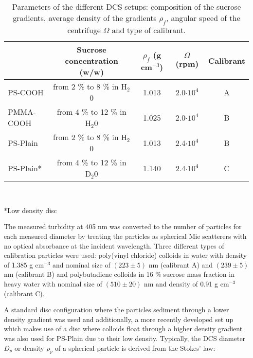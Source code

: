 \begin{table*}[]
\centering
\caption[Parameters of the different DCS setups.]{Parameters of the different DCS setups: composition of the sucrose gradients, average density of the gradients $\rho_f$, angular speed of the centrifuge $\Omega$ and type of calibrant.}
\label{tab:DCSParameters}
\begin{tabular}{l|c|c|c|c|}
\cline{2-5}
\multicolumn{1}{c|}{}                         & Sucrose concentration (w/w)    & $\rho_f$ (g cm$^{-3}$) & $\Omega$ (rpm)  & Calibrant \\ \hline
\multicolumn{1}{|l|}{PS-COOH}    & from 2 \% to 8 \% in H$_2$0  & 1.013                  & 2.0$\cdot 10^4$                  & A         \\ \hline
\multicolumn{1}{|l|}{PMMA-COOH}  & from 4 \% to 12 \% in H$_2$0 & 1.025                  & 2.0$\cdot 10^4$                  & B         \\ \hline
\multicolumn{1}{|l|}{PS-Plain}      & from 2 \% to 8 \% in H$_2$0  & 1.013     & 2.4$\cdot 10^4$                  & B        \\ \hline
\multicolumn{1}{|l|}{PS-Plain*} & from 4 \% to 12 \% in D$_2$0 & 1.140     & 2.4$\cdot 10^4$                  & C         \\ \hline

\end{tabular}\\[0.3\baselineskip]
\begin{minipage}{15cm}
	\begin{raggedright}
	*\small{Low density disc}
	\end{raggedright}
\end{minipage}
\label{tab:composition}
\end{table*}

The measured turbidity at 405 nm was converted to the number of particles for each measured diameter by treating the particles as spherical Mie scatterers with no optical absorbance at the incident wavelength. Three different types of calibration particles were used: poly(vinyl chloride) colloids in water with density of 1.385 g cm$^{-3}$ and nominal size of $(223\pm5)$ nm (calibrant A) and $(239\pm5)$ nm (calibrant B) and polybutadiene colloids in 16 \% sucrose mass fraction in heavy water with nominal size of $(510\pm20)$ nm and density of 0.91 g cm$^{-3}$ (calibrant C). 

A standard disc configuration where the particles sediment through a lower density gradient was used and additionally, a more recently developed set up which makes use of a disc where colloids float through a higher density gradient was also used for PS-Plain due to their low density\citep{fitzpatrick_structure_1998}. Typically, the DCS diameter $D_p$ or density $\rho_p$ of a spherical particle is derived from the Stokes' law:

